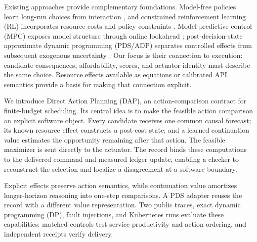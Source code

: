 \documentclass[acmsmall,screen,review,anonymous]{acmart}
\begin{document}
Existing approaches provide complementary foundations. Model-free policies
learn long-run choices from interaction
\cite{schulman2017ppo,sutton2018rl,vanhasselt2016double}, and constrained
reinforcement learning (RL) incorporates resource costs and policy constraints
\cite{achiam2017cpo,chow2018lyapunov,stooke2020pid,tessler2019rcpo,zhang2022p3o}.
Model predictive control (MPC) exposes model structure through online
lookahead \cite{mesbah2016smpc}; post-decision-state approximate dynamic
programming (PDS/ADP) separates controlled effects from subsequent exogenous
uncertainty \cite{bhat2026pds,jiang2015monotoneadp,powell2011adp}.
Our focus is their connection to execution: candidate consequences,
affordability, scores, and actuator identity must describe the same choice.
Resource effects available as equations or calibrated API semantics provide
a basis for making that connection explicit.

We introduce Direct Action Planning (DAP), an action-comparison contract for
finite-budget scheduling. Its central idea is to make the feasible action
comparison an explicit software object. Every candidate receives one common
causal forecast; its known resource effect constructs a post-cost state;
and a learned continuation value estimates the opportunity remaining after
that action. The feasible maximizer is sent directly to the actuator. The
record binds these computations to the delivered command and measured ledger
update, enabling a checker to reconstruct the selection and localize a
disagreement at a software boundary.

Explicit effects preserve action semantics, while continuation value amortizes
longer-horizon reasoning into one-step comparisons. A PDS adapter reuses the
record with a different value representation. Two public traces, exact
dynamic programming (DP), fault injections, and Kubernetes runs evaluate these
capabilities: matched controls test service productivity and action ordering,
and independent receipts verify delivery.
\end{document}
